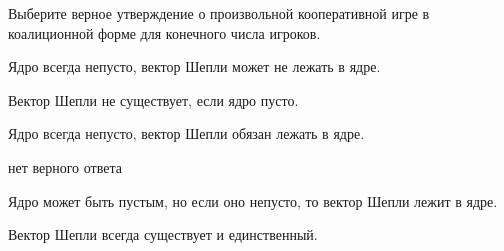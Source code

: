 
\begin{question}
Выберите верное утверждение о произвольной кооперативной игре в коалиционной форме для конечного числа игроков.
\begin{answerlist}
  \item Ядро всегда непусто, вектор Шепли может не лежать в ядре.
  \item Вектор Шепли не существует, если ядро пусто.
  \item Ядро всегда непусто, вектор Шепли обязан лежать в ядре.
  \item нет верного ответа
  \item Ядро может быть пустым, но если оно непусто, то вектор Шепли лежит в ядре.
  \item Вектор Шепли всегда существует и единственный.
\end{answerlist}
\end{question}


